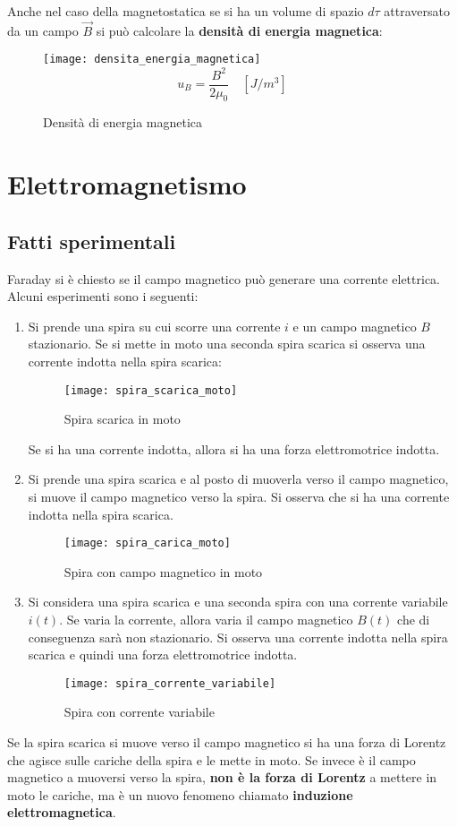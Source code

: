 \documentclass[a4paper]{article}
\begin{document}
\vspace{1em}
\noindent
Anche nel caso della magnetostatica se si ha un volume di spazio \( d \tau \)
attraversato da un campo \( \vec{B} \) si può calcolare la \textbf{densità di energia magnetica}:
\begin{figure}[H]
  \centering
  \texttt{[image: densita\_energia\_magnetica]}
  \[
    u_B = \frac{B^2}{2 \mu_0} \quad \left[ J/m^3 \right]
  \] 
  \caption{Densità di energia magnetica}
\end{figure}

\section{Elettromagnetismo}
\subsection{Fatti sperimentali}
Faraday si è chiesto se il campo magnetico può generare una corrente elettrica. 
Alcuni esperimenti sono i seguenti:
\begin{enumerate}
  \item Si prende una spira su cui scorre una corrente \( i \) e un campo magnetico \( B \)
    stazionario. Se si mette in moto una seconda spira scarica si osserva una corrente
    indotta nella spira scarica:
    \begin{figure}[H]
      \centering
      \texttt{[image: spira\_scarica\_moto]}
      \caption{Spira scarica in moto}
    \end{figure}
    \noindent
    Se si ha una corrente indotta, allora si ha una forza elettromotrice indotta.

  \item Si prende una spira scarica e al posto di muoverla verso il campo magnetico,
    si muove il campo magnetico verso la spira. Si osserva che si ha una corrente indotta
    nella spira scarica.
    \begin{figure}[H]
      \centering
      \texttt{[image: spira\_carica\_moto]}
      \caption{Spira con campo magnetico in moto}
    \end{figure}

  \item Si considera una spira scarica e una seconda spira con una corrente variabile
    \( i(t) \). Se varia la corrente, allora varia il campo magnetico \( B(t) \) che di conseguenza
    sarà non stazionario. Si osserva una corrente indotta nella spira
    scarica e quindi una forza elettromotrice indotta.
    \begin{figure}[H]
      \centering
      \texttt{[image: spira\_corrente\_variabile]}
      \caption{Spira con corrente variabile}
    \end{figure}
\end{enumerate}
Se la spira scarica si muove verso il campo magnetico si ha una forza di Lorentz che agisce
sulle cariche della spira e le mette in moto. Se invece è il campo magnetico a muoversi
verso la spira, \textbf{non è la forza di Lorentz} a mettere in moto le cariche, ma è un
nuovo fenomeno chiamato \textbf{induzione elettromagnetica}.
\end{document}
